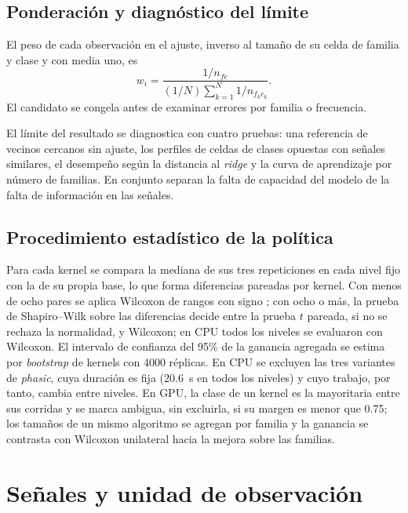 \subsection{Ponderación y diagnóstico del límite}

El peso de cada observación en el ajuste, inverso al tamaño de su celda de familia y clase y con media uno, es
\begin{equation}
w_i=\frac{1/n_{fc}}{(1/N)\sum_{k=1}^{N}1/n_{f_kc_k}}.
\label{eq:peso-familia-clase}
\end{equation}
El candidato se congela antes de examinar errores por familia o frecuencia.

\label{sec:metodologia-limite-cpu}
El límite del resultado se diagnostica con cuatro pruebas: una referencia de vecinos cercanos sin ajuste, los perfiles de celdas de clases opuestas con señales similares, el desempeño según la distancia al \textit{ridge} y la curva de aprendizaje por número de familias. En conjunto separan la falta de capacidad del modelo de la falta de información en las señales.

\subsection{Procedimiento estadístico de la política}
\label{sec:metodologia-politica-cpu}\label{sec:metodologia-politica-gpu}

Para cada kernel se compara la mediana de sus tres repeticiones en cada nivel fijo con la de su propia base, lo que forma diferencias pareadas por kernel. Con menos de ocho pares se aplica Wilcoxon de rangos con signo \cite{Hollander2014}; con ocho o más, la prueba de Shapiro--Wilk sobre las diferencias decide entre la prueba $t$ pareada, si no se rechaza la normalidad, y Wilcoxon; en CPU todos los niveles se evaluaron con Wilcoxon. El intervalo de confianza del 95\% de la ganancia agregada se estima por \textit{bootstrap} de kernels con 4000 réplicas. En CPU se excluyen las tres variantes de \textit{phasic}, cuya duración es fija (20.6~s en todos los niveles) y cuyo trabajo, por tanto, cambia entre niveles. En GPU, la clase de un kernel es la mayoritaria entre sus corridas y se marca ambigua, sin excluirla, si su margen es menor que 0.75; los tamaños de un mismo algoritmo se agregan por familia y la ganancia se contrasta con Wilcoxon unilateral hacia la mejora sobre las familias.

\section{Señales y unidad de observación}

